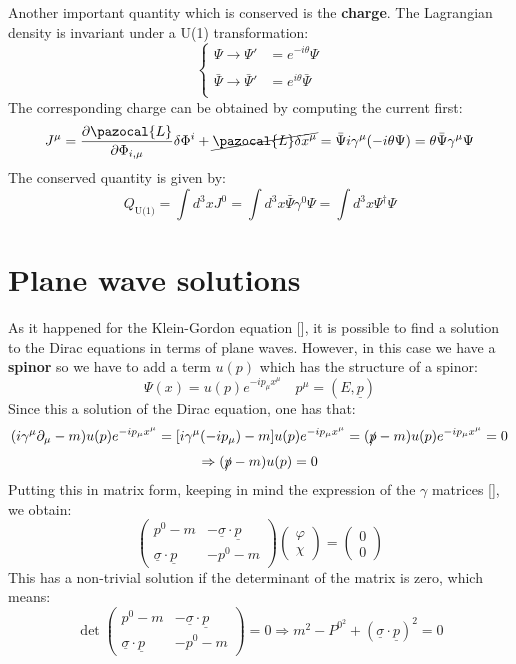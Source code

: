 \documentclass[../main.tex]{subfiles}
\begin{document}
Another important quantity which is conserved is the \textbf{charge}. The Lagrangian density is invariant under a U(1) transformation:
\[
\left\{
\begin{aligned}
\Psi\xrightarrow[]{}\Psi'&=e^{-i\theta}\Psi\\
\bar{\Psi}\xrightarrow[]{}\bar{\Psi}'&=e^{i\theta}\bar{\Psi}
\end{aligned}
\right.
\]
The corresponding charge can be obtained by computing the current first:
\[
J^\mu=\frac{\partial\pazocal{L}}{\partial\Phi_{i,\mu}}\delta\Phi^i+\cancel{\pazocal{L}\delta x^\mu}=\bar{\Psi}i\gamma^\mu(-i\theta\Psi)=\theta\bar{\Psi}\gamma^\mu\Psi
\]
The conserved quantity is given by:
\[
Q_{\text{U(1)}}=\int d^3x J^0=\int d^3x\bar{\Psi}\gamma^0\Psi=\int d^3x\Psi^\dagger\Psi
\]
\section{Plane wave solutions}
As it happened for the Klein-Gordon equation [], it is possible to find a solution to the Dirac equations in terms of plane waves. However, in this case we have a \textbf{spinor} so we have to add a term $u(p)$ which has the structure of a spinor:
\[
\Psi(x)=u(p)e^{-ip_\mu x^\mu} \quad p^\mu=(E,\underline{p})
\]
Since this a solution of the Dirac equation, one has that:
\[
(i\gamma^\mu\partial_\mu-m)u(p)e^{-ip_\mu x^\mu}=[i\gamma^\mu(-ip_\mu)-m]u(p)e^{-ip_\mu x^\mu}=(\slashed{p}-m)u(p)e^{-ip_\mu x^\mu}=0
\]
\[
\Rightarrow(\slashed{p}-m)u(p)=0
\]
Putting this in  matrix form, keeping in mind the expression of the $\gamma$ matrices [], we obtain:
\[
\left(\begin{array}{cc}
    p^0-m & -\underline{\sigma}\cdot\underline{p} \\
    \underline{\sigma}\cdot\underline{p} & -p^0-m
\end{array}\right)\left(\begin{array}{c}
    \varphi\\
    \chi
\end{array}\right)=\left(\begin{array}{c}
    0\\
    0
\end{array}\right)
\]
This has a non-trivial solution if the determinant of the matrix is zero, which means:
\[
\det\left(\begin{array}{cc}
    p^0-m & -\underline{\sigma}\cdot\underline{p} \\
    \underline{\sigma}\cdot\underline{p} & -p^0-m
\end{array}\right)=0\Rightarrow m^2-P^{0^2}+(\underline{\sigma}\cdot\underline{p})^2=0
\]
\end{document}
